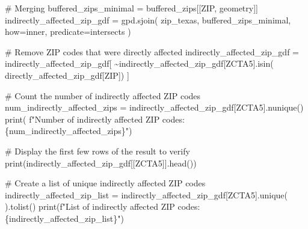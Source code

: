 \documentclass[
  letterpaper,
  DIV=11,
  numbers=noendperiod]{scrartcl}
\newenvironment{Shaded}{\begin{snugshade}}{\end{snugshade}}
\newcommand{\BuiltInTok}[1]{\textcolor[rgb]{0.00,0.23,0.31}{#1}}
\newcommand{\CommentTok}[1]{\textcolor[rgb]{0.37,0.37,0.37}{#1}}
\newcommand{\NormalTok}[1]{\textcolor[rgb]{0.00,0.23,0.31}{#1}}
\newcommand{\OperatorTok}[1]{\textcolor[rgb]{0.37,0.37,0.37}{#1}}
\newcommand{\SpecialCharTok}[1]{\textcolor[rgb]{0.37,0.37,0.37}{#1}}
\newcommand{\SpecialStringTok}[1]{\textcolor[rgb]{0.13,0.47,0.30}{#1}}
\newcommand{\StringTok}[1]{\textcolor[rgb]{0.13,0.47,0.30}{#1}}
\begin{document}
\begin{Shaded}
\begin{Highlighting}[]
\CommentTok{\# Merging}
\NormalTok{buffered\_zips\_minimal }\OperatorTok{=}\NormalTok{ buffered\_zips[[}\StringTok{\textquotesingle{}ZIP\textquotesingle{}}\NormalTok{, }\StringTok{\textquotesingle{}geometry\textquotesingle{}}\NormalTok{]]}
\NormalTok{indirectly\_affected\_zip\_gdf }\OperatorTok{=}\NormalTok{ gpd.sjoin(}
\NormalTok{    zip\_texas,}
\NormalTok{    buffered\_zips\_minimal,}
\NormalTok{    how}\OperatorTok{=}\StringTok{\textquotesingle{}inner\textquotesingle{}}\NormalTok{,}
\NormalTok{    predicate}\OperatorTok{=}\StringTok{\textquotesingle{}intersects\textquotesingle{}}
\NormalTok{)}

\CommentTok{\# Remove ZIP codes that were directly affected}
\NormalTok{indirectly\_affected\_zip\_gdf }\OperatorTok{=}\NormalTok{ indirectly\_affected\_zip\_gdf[}
    \OperatorTok{\textasciitilde{}}\NormalTok{indirectly\_affected\_zip\_gdf[}\StringTok{\textquotesingle{}ZCTA5\textquotesingle{}}\NormalTok{].isin(}
\NormalTok{        directly\_affected\_zip\_gdf[}\StringTok{\textquotesingle{}ZIP\textquotesingle{}}\NormalTok{])}
\NormalTok{]}

\CommentTok{\# Count the number of indirectly affected ZIP codes}
\NormalTok{num\_indirectly\_affected\_zips }\OperatorTok{=}\NormalTok{ indirectly\_affected\_zip\_gdf[}\StringTok{\textquotesingle{}ZCTA5\textquotesingle{}}\NormalTok{].nunique()}
\BuiltInTok{print}\NormalTok{(}
    \SpecialStringTok{f"Number of indirectly affected ZIP codes: }\SpecialCharTok{\{}\NormalTok{num\_indirectly\_affected\_zips}\SpecialCharTok{\}}\SpecialStringTok{"}\NormalTok{)}

\CommentTok{\# Display the first few rows of the result to verify}
\BuiltInTok{print}\NormalTok{(indirectly\_affected\_zip\_gdf[[}\StringTok{\textquotesingle{}ZCTA5\textquotesingle{}}\NormalTok{]].head())}

\CommentTok{\# Create a list of unique indirectly affected ZIP codes}
\NormalTok{indirectly\_affected\_zip\_list }\OperatorTok{=}\NormalTok{ indirectly\_affected\_zip\_gdf[}\StringTok{\textquotesingle{}ZCTA5\textquotesingle{}}\NormalTok{].unique(}
\NormalTok{).tolist()}
\BuiltInTok{print}\NormalTok{(}\SpecialStringTok{f"List of indirectly affected ZIP codes: }\SpecialCharTok{\{}\NormalTok{indirectly\_affected\_zip\_list}\SpecialCharTok{\}}\SpecialStringTok{"}\NormalTok{)}
\end{Highlighting}
\end{Shaded}
\end{document}
